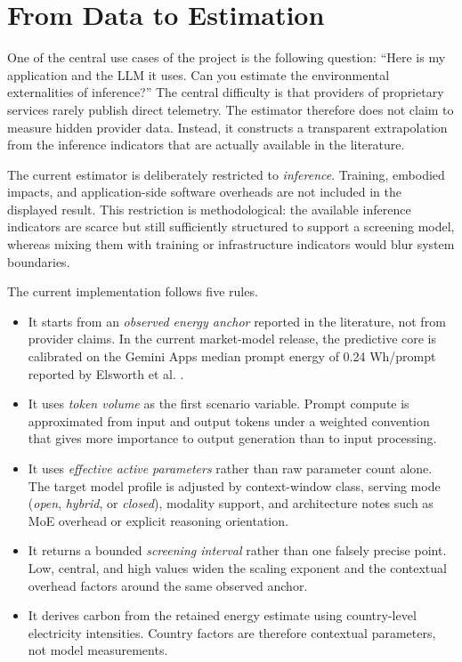 \documentclass[11pt,a4paper]{article}
\begin{document}
\section{From Data to Estimation}
One of the central use cases of the project is the following question: ``Here is my application and the LLM it uses. Can you estimate the environmental externalities of inference?'' The central difficulty is that providers of proprietary services rarely publish direct telemetry. The estimator therefore does not claim to measure hidden provider data. Instead, it constructs a transparent extrapolation from the inference indicators that are actually available in the literature.

The current estimator is deliberately restricted to \emph{inference}. Training, embodied impacts, and application-side software overheads are not included in the displayed result. This restriction is methodological: the available inference indicators are scarce but still sufficiently structured to support a screening model, whereas mixing them with training or infrastructure indicators would blur system boundaries.

The current implementation follows five rules.
\begin{itemize}
\item It starts from an \emph{observed energy anchor} reported in the literature, not from provider claims. In the current market-model release, the predictive core is calibrated on the Gemini Apps median prompt energy of 0.24 Wh/prompt reported by Elsworth et al. \cite{elsworth2025}.
\item It uses \emph{token volume} as the first scenario variable. Prompt compute is approximated from input and output tokens under a weighted convention that gives more importance to output generation than to input processing.
\item It uses \emph{effective active parameters} rather than raw parameter count alone. The target model profile is adjusted by context-window class, serving mode (\emph{open}, \emph{hybrid}, or \emph{closed}), modality support, and architecture notes such as MoE overhead or explicit reasoning orientation.
\item It returns a bounded \emph{screening interval} rather than one falsely precise point. Low, central, and high values widen the scaling exponent and the contextual overhead factors around the same observed anchor.
\item It derives carbon from the retained energy estimate using country-level electricity intensities. Country factors are therefore contextual parameters, not model measurements.
\end{itemize}
\end{document}
